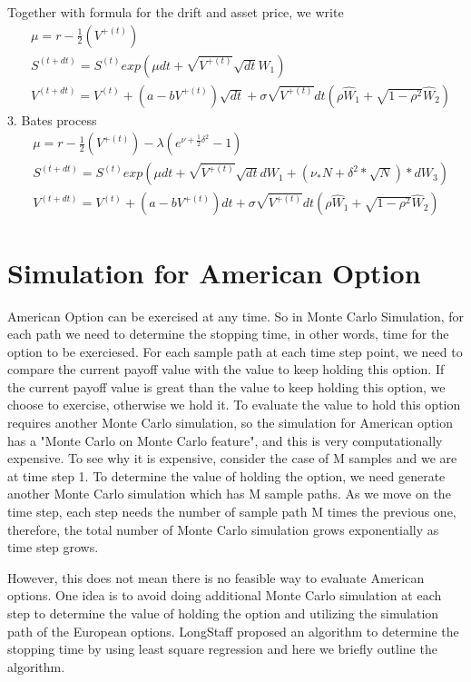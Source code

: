 \documentclass[a4paper]{article}
\begin{document}
Together with formula for the drift and asset price, we write
\begin{align*}
	& \mu = r - \frac{1}{2} (V^{+(t)})\\
	& S^{(t + dt)} = S^{(t)}exp(\mu dt + \sqrt{V^{+(t)}} \sqrt{dt} W_1) \\
	& V^{(t + dt)} = V^{(t)} + (a - b V^{+(t)}) \sqrt{dt} + \sigma \sqrt{V^{+(t)}} dt (\rho \hat W_1
	+ \sqrt{1 - \rho^2} \hat W_2) 
\end{align*}        
3. Bates process\\
\begin{align*}
	& \mu = r - \frac{1}{2} (V^{+(t)}) - \lambda (e^{\nu + \frac{1}{2}\delta^2}  -1) \\
	& S^{(t + dt)} = S^{(t)}exp(\mu dt  + \sqrt{V^{+(t)}} \sqrt{dt} dW_1 
	   + (\nu_*N+\delta^2*\sqrt{N})*dW_3)\\
	& V^{(t + dt)} = V^{(t)} + (a - b V^{+(t)}) dt + \sigma \sqrt{V^{+(t)}} dt (\rho \hat W_1
	+ \sqrt{1 - \rho^2} \hat W_2 )
\end{align*}
\section{Simulation for American Option}
American Option can be exercised at any time. So in Monte Carlo Simulation, for each path we need to determine the stopping time, in other words, time for the option to be exerciesed. For each sample path at each time step point, we need to compare the current payoff value with the value to keep holding this option. If the current payoff value is great than the value to keep holding this option, we choose to exercise, otherwise we hold it. To evaluate the value to hold this option requires another Monte Carlo simulation, so the simulation for American option has a "Monte Carlo on Monte Carlo feature", and this is very computationally expensive. To see why it is expensive, consider the case of M samples and we are at time step 1. To determine the value of holding the option, we need generate another Monte Carlo simulation which has M sample paths. As we move on the time step, each step needs the number of sample path M times the previous one, therefore, the total number of Monte Carlo simulation grows exponentially as time step grows. 

However, this does not mean there is no feasible way to evaluate American options. One idea is to avoid doing additional Monte Carlo simulation at each step to determine the value of holding the option and utilizing the simulation path of the European options. LongStaff\cite{americanoption} proposed an algorithm to determine the stopping time by using least square regression and here we briefly outline the algorithm.
\end{document}
